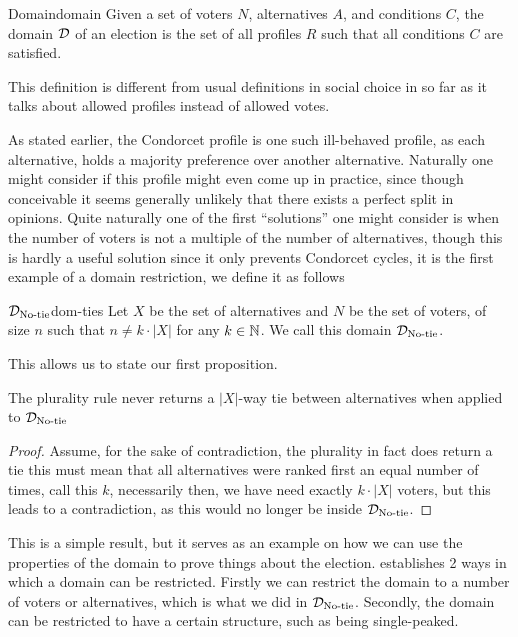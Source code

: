 \begin{definition}{Domain}{domain}
	{
		Given a set of voters $N$, alternatives $A$, and conditions $C$, the domain $\mathcal{D}_{\textnormal{}}$ of an election is the set of all profiles $R$ such that all conditions $C$ are satisfied.
	}
\end{definition}

This definition is different from usual definitions in social choice in so far as it talks about allowed profiles instead of allowed votes.


As stated earlier, the Condorcet profile is one such ill-behaved profile, as each alternative, holds a majority preference over another alternative. Naturally one might consider if this profile might even come up in practice, since though conceivable it seems generally unlikely that there exists a perfect split in opinions. Quite naturally one of the first ``solutions” one might consider is when the number of voters is not a multiple of the number of alternatives, though this is hardly a useful solution since it only prevents Condorcet cycles, it is the first example of a domain restriction, we define it as follows

\begin{definition}{$\mathcal{D}_{\textnormal{No-tie}}$}{dom-ties}
	Let $X$ be the set of alternatives and $N$ be the set of voters, of size $n$ such that $n \neq k \cdot |X|$ for any $k \in \mathbb{N}$. We call this domain $\mathcal{D}_{\textnormal{No-tie}}$.
\end{definition}

This allows us to state our first proposition.

\begin{proposition}
	The plurality rule never returns a $|X|$-way tie between alternatives when applied to $\mathcal{D}_{\textnormal{No-tie}}$
\end{proposition}

\begin{proof}
	Assume, for the sake of contradiction, the plurality in fact does return a tie this must mean that all alternatives were ranked first an equal number of times, call this $k$, necessarily then, we have need exactly $k \cdot |X|$ voters, but this leads to a contradiction, as this would no longer be inside $\mathcal{D}_{\textnormal{No-tie}}$.
\end{proof}

This is a simple result, but it serves as an example on how we can use the properties of the domain to prove things about the election. \citet{gaertnerDomainRestrictions2002} establishes 2 ways in which a domain can be restricted. Firstly we can restrict the domain to a number of voters or alternatives, which is what we did in $\mathcal{D}_{\textnormal{No-tie}}$. Secondly, the domain can be restricted to have a certain structure, such as being single-peaked.

